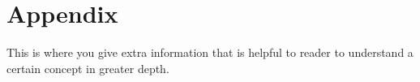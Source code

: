 \chapter*{Appendix}

This is where you give extra information that is helpful to reader to understand a certain concept in greater depth.